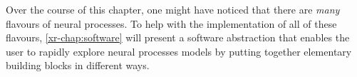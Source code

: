 \documentclass[12pt, twoside]{report}
\newcommand{\xrprefix}[1]{xr-#1}
\begin{document}
Over the course of this chapter, one might have noticed that there are \emph{many} flavours of neural processes.
To help with the implementation of all of these flavours,
\cref{\xrprefix{chap:software}} will present a software abstraction that enables the user to rapidly explore neural processes models by putting together elementary building blocks in different ways.
\end{document}
